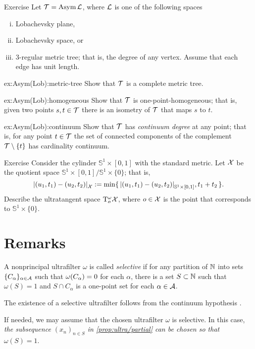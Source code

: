 \begin{thm}{Exercise}\label{ex:Asym(Lob)}
Let $\mathcal{T}=\mathop{\rm Asym}\nolimits\mathcal{L}$, where $\mathcal{L}$ is one of the following spaces
\begin{enumerate}[(i)]
 \item Lobachevsky plane,
 \item Lobachevsky space, or
 \item 3-regular metric tree; that is, the degree of any vertex. Assume that each edge has unit length.
\end{enumerate}


\begin{subthm}{ex:Asym(Lob):metric-tree}
Show that $\mathcal{T}$ is a complete metric tree.
\end{subthm}

\begin{subthm}{ex:Asym(Lob):homogeneous}
Show that $\mathcal{T}$ is one-point-homogeneous; that is, given two points $s,t\in \mathcal{T}$ there is an isometry of $\mathcal{T}$ that maps $s$ to $t$.
\end{subthm}

\begin{subthm}{ex:Asym(Lob):continuum}
Show that $\mathcal{T}$ has \emph{continuum degree} at any point;
that is, for any point $t\in \mathcal{T}$ the set of connected components of the complement $\mathcal{T}\setminus\{t\}$ has cardinality continuum.
\end{subthm}

\end{thm}


\begin{thm}{Exercise}\label{ex:T(Sx[0,1]/Sx0)}
Consider the cylinder $\mathbb{S}^1\times[0,1]$ with the standard metric.
Let $\mathcal{X}$ be the quotient space $\mathbb{S}^1\times[0,1]/\mathbb{S}^1\times\{0\}$;
that is, 
\[\dist{(u_1,t_1)}{(u_2,t_2)}{\spc{X}}
\df
\min\{\,\dist{(u_1,t_1)}{(u_2,t_2)}{\mathbb{S}^1\times[0,1]},t_1+t_2\,\}.\]
Describe the ultratangent space $\mathrm{T}_o^{\omega}\mathcal{X}$, where $o\in\mathcal{X}$ is the point that corresponds to $\mathbb{S}^1\times\{0\}$.
\end{thm}


\section{Remarks}

A nonprincipal ultrafilter $\omega$ is called 
\emph{selective} if for any partition of $\mathbb{N}$ into sets $\{C_\alpha\}_{\alpha\in\mathcal{A}}$ such that $\omega(C_\alpha)\z=0$ for each $\alpha$, 
there is a set $S\subset \mathbb{N}$ such that $\omega(S)=1$ and $S\cap C_\alpha$ is a one-point set for each $\alpha\in\mathcal{A}$.

The existence of a selective ultrafilter follows from the continuum hypothesis \cite{rudin}.

If needed, we may assume that the chosen ultrafilter $\omega$ is selective.
In this case, \textit{the subsequence $(x_n)_{n\in S}$ in \ref{prop:ultra/partial} can be chosen so that $\omega(S)=1$}.
